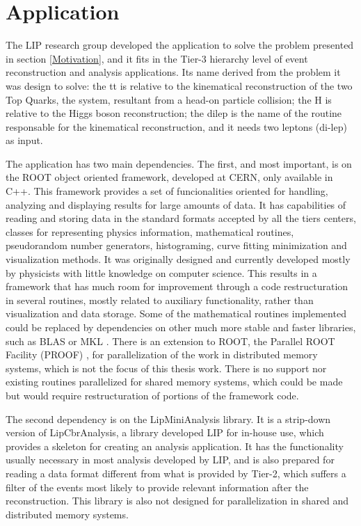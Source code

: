 \chapter{\tth Application}
\label{Application}

The LIP research group developed the \tth application to solve the problem presented in section \ref{Motivation}, and it fits in the Tier-3 hierarchy level of event reconstruction and analysis applications. Its name derived from the problem it was design to solve: the tt is relative to the kinematical reconstruction of the two Top Quarks, the \ttbar system, resultant from a head-on particle collision; the H is relative to the Higgs boson reconstruction; the dilep is the name of the routine responsable for the kinematical reconstruction, and it needs two leptons (di-lep) as input.

The application has two main dependencies. The first, and most important, is on the ROOT \cite{CERN:ROOT} object oriented framework, developed at CERN, only available in C++. This framework provides a set of funcionalities oriented for handling, analyzing and displaying results for large amounts of data. It has capabilities of reading and storing data in the standard formats accepted by all the tiers centers, classes for representing physics information, mathematical routines, pseudorandom number generators, histograming, curve fitting minimization and visualization methods. It was originally designed and currently developed mostly by physicists with little knowledge on computer science. This results in a framework that has much room for improvement through a code restructuration in several routines, mostly related to auxiliary functionality, rather than visualization and data storage. Some of the mathematical routines implemented could be replaced by dependencies on other much more stable and faster libraries, such as BLAS \cite{BLAS} or MKL \cite{MKL}. There is an extension to ROOT, the Parallel ROOT Facility (PROOF) \cite{CERN:PROOF}, for parallelization of the work in distributed memory systems, which is not the focus of this thesis work. There is no support nor existing routines parallelized for shared memory systems, which could be made but would require restructuration of portions of the framework code.

The second dependency is on the LipMiniAnalysis library. It is a strip-down version of LipCbrAnalysis, a library developed LIP for in-house use, which provides a skeleton for creating an analysis application. It has the functionality usually necessary in most analysis developed by LIP, and is also prepared for reading a data format different from what is provided by Tier-2, which suffers a filter of the events most likely to provide relevant information after the reconstruction. This library is also not designed for parallelization in shared and distributed memory systems.

